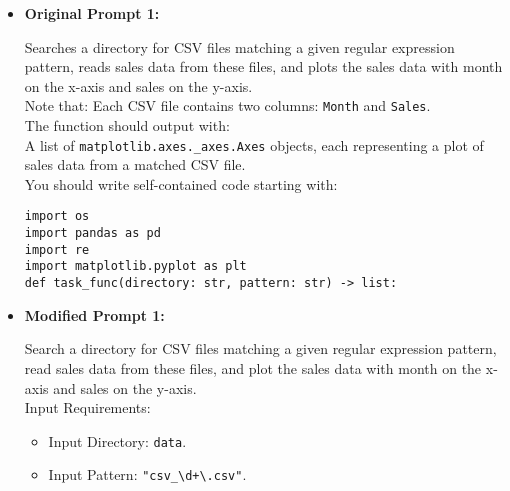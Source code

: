 \begin{itemize}
    \item \textbf{Original Prompt 1:}

\begin{tcolorbox}[colback=blue!5!white, colframe=blue!75!black, title=Modified Prompt 1:, text width=\textwidth]
Searches a directory for CSV files matching a given regular expression pattern, reads sales data from these files, and plots the sales data with month on the x-axis and sales on the y-axis.\\
Note that: Each CSV file contains two columns: \texttt{Month} and \texttt{Sales}.\\
The function should output with: \\
A list of \texttt{matplotlib.axes.\_axes.Axes} objects, each representing a plot of sales data from a matched CSV file.\\
You should write self-contained code starting with:
\begin{verbatim}
import os
import pandas as pd
import re
import matplotlib.pyplot as plt
def task_func(directory: str, pattern: str) -> list:
\end{verbatim}
\end{tcolorbox}



    \item \textbf{Modified Prompt 1:}

\onecolumn
\begin{tcolorbox}[colback=blue!5!white, colframe=blue!75!black, title=Modified Prompt 1:, text width=\textwidth]
Search a directory for CSV files matching a given regular expression pattern, read sales data from these files, and plot the sales data with month on the x-axis and sales on the y-axis.\\

Input Requirements:
\begin{itemize}
    \item Input Directory: \texttt{data}.
    \item Input Pattern: \texttt{"csv\_\textbackslash d+\textbackslash.csv"}.
\end{itemize}


\end{tcolorbox}
\end{itemize}
